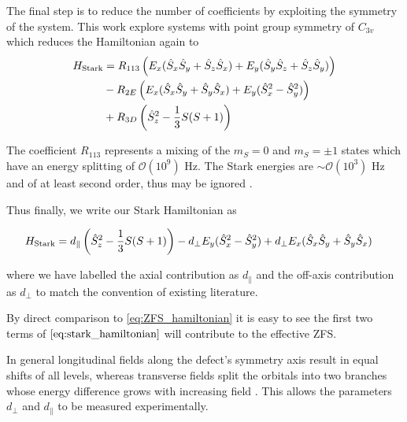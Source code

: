 The final step is to reduce the number of coefficients by exploiting the symmetry of the system. This work explore systems with point group symmetry of $C_{3v}$ \cite{Davidsson2018} which reduces the Hamiltonian again to \cite{mims}
\begin{equation}
    \begin{align}
        H_{\ce{Stark}} &= R_{113}\left(E_x (\hat{S}_x\hat{S}_y + \hat{S}_z\hat{S}_x) + E_y(\hat{S}_y\hat{S}_z + \hat{S}_z\hat{S}_y) \right) \\ 
                       &- R_{2E} \left(E_x(\hat{S}_x\hat{S}_y + \hat{S}_y\hat{S}_x) + E_y(\hat{S}_x^2 - \hat{S}_y^2   )\right) \\ 
                       &+ R_{3D}\left(\hat{S}_z^2 - \frac{1}{3} S(S+1)\right)
    \end{align}
    \label{eq:}
\end{equation}


The coefficient $R_{113}$ represents a mixing of the $m_S = 0$ and $m_S = \pm 1$ states which have an energy splitting of $\mathcal{O}(10^9)$ Hz. The Stark energies are $\sim \mathcal{O} (10^3)$ Hz and of at least second order, thus may be ignored \cite{VanOort1990}.  

Thus finally, we write our Stark Hamiltonian as 

\begin{equation}
    \begin{align}
        H_{\ce{Stark}} &=
                        d_\parallel\left(\hat{S}_z^2 - \frac{1}{3} S(S+1)\right)
        - d_\perp  E_y(\hat{S}_x^2 - \hat{S}_y^2   ) + d_\perp E_x(\hat{S}_x\hat{S}_y + \hat{S}_y\hat{S}_x)  
    \end{align}
    \label{eq:stark_hamiltonian}
\end{equation}

where we have labelled the axial contribution as $d_\parallel$ and the off-axis contribution as $d_\perp$ to match the convention of existing literature. 

By direct comparison to \eqref{eq:ZFS_hamiltonian} it is easy to see the first two terms of $\eqref{eq:stark_hamiltonian}$ will contribute to the effective ZFS.  

In general longitudinal fields along the defect’s symmetry axis result in equal shifts of all levels, whereas transverse fields split the orbitals into two branches whose energy difference grows with increasing field \cite{Acosta2012, Bassett2011}. This allows the parameters $d_\perp$ and $d_\parallel$ to be measured experimentally. 


